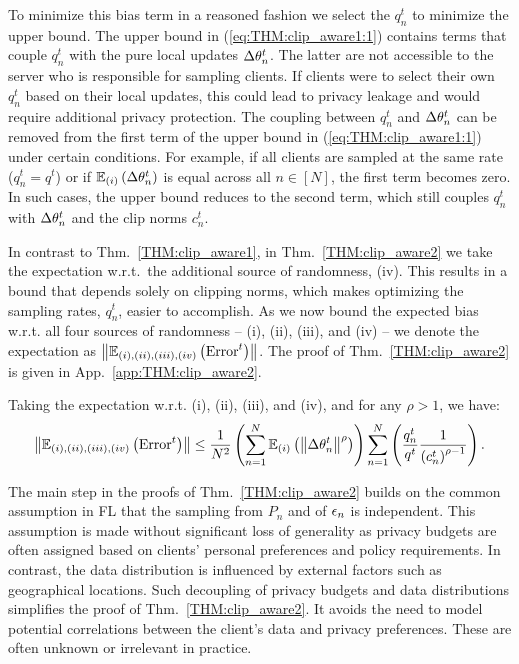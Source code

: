 To minimize this bias term in a reasoned fashion we select the $q_n^t$ to minimize the upper bound. The upper bound in (\ref{eq:THM:clip_aware1:1}) contains terms that couple $q_n^t$ with the pure local updates $\Delta {\theta}_n^t$.  The latter are not accessible to the server who is responsible for sampling clients. If clients were to select their own $q_n^t$ based on their local updates, this could lead to privacy leakage and would require additional privacy protection. The coupling between $q_n^t$ and $\Delta {\theta}_n^t$ can be removed from the first term of the upper bound in (\ref{eq:THM:clip_aware1:1}) under certain conditions. For example, if all clients are sampled at the same rate ($q_n^t=q^t$) or if $\mathbb{E}_{(i)}\left({\Delta {\theta}_n^t}\right)$ is equal across all $n\in [N]$, the first term becomes zero. In such cases, the upper bound reduces to the second term, which still couples  $q_n^t$ with $\Delta {\theta}_n^t$ and the clip norms $c_n^t$. 

In contrast to Thm.~\ref{THM:clip_aware1}, in Thm.~\ref{THM:clip_aware2} we take the expectation w.r.t.~the additional source of randomness, (iv).  This results in a bound that depends solely on clipping norms, which makes optimizing the sampling rates, $q_n^t$, easier to accomplish.  As we now bound the expected bias w.r.t. all four sources of randomness -- (i), (ii), (iii), and (iv) -- we denote the expectation as $\left\| \mathbb{E}_{(i), (ii), (iii), (iv)}\left({\text{Error}^t}\right)\right\|$. The proof of Thm.~\ref{THM:clip_aware2} is given in App.~\ref{app:THM:clip_aware2}.
 
\begin{theorem}\label{THM:clip_aware2} Taking the expectation w.r.t. (i), (ii), (iii), and (iv), and for any $\rho>1$, we have:
\begin{align}
\left\| \mathbb{E}_{(i), (ii), (iii), (iv)}\left({\text{Error}^t}\right)\right\| \leq \frac{1}{N^2}\left(\sum_{n=1}^N\mathbb{E}_{(i)}\left({\left\|{\Delta {\theta}_n^t}\right\|^{\rho}}\right)\right)\sum_{n=1}^N \left( \frac{q_n^t}{q^t}  \frac{1}{\left(c_n^t\right)^{\rho-1}}\right).
\end{align}
\end{theorem}


The main step in the proofs of Thm.~\ref{THM:clip_aware2} builds on the common assumption in FL that the sampling from $P_n$ and of ${\epsilon}_n$ is independent. This assumption is made without significant loss of generality as privacy budgets are often assigned based on clients' personal preferences and policy requirements.  In contrast, the data distribution is influenced by external factors such as geographical locations. Such decoupling of privacy budgets and data distributions simplifies the proof of Thm.~\ref{THM:clip_aware2}.  It avoids the need to model potential correlations between the client's data and privacy preferences.  These are often unknown or irrelevant in practice. 

